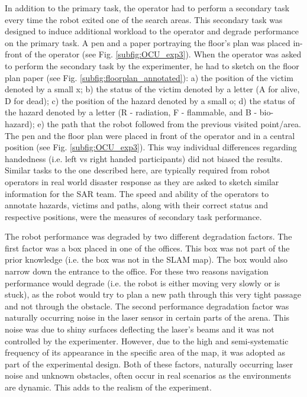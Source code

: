\documentclass[a4paper,12pt,oneside,openright]{bhamthesis}
\begin{document}
In addition to the primary task, the operator had to perform a secondary task every time the robot exited one of the search areas. This secondary task was designed to induce additional workload to the operator and degrade performance on the primary task. A pen and a paper portraying the floor's plan was placed in-front of the operator (see Fig. \ref{subfig:OCU_exp3}). When the operator was asked to perform the secondary task by the experimenter, he had to sketch on the floor plan paper (see Fig. \ref{subfig:floorplan_annotated}): a) the position of the victim denoted by a small x; b) the status of the victim denoted by a letter (A for alive, D for dead); c) the position of the hazard denoted by a small o; d) the status of the hazard denoted by a letter (R - radiation, F - flammable, and B - bio-hazard); e) the path that the robot followed from the previous visited point/area. The pen and the floor plan were placed in front of the operator and in a central position (see Fig. \ref{subfig:OCU_exp3}). This way individual differences regarding handedness (i.e. left vs right handed participants) did not biased the results. Similar tasks to the one described here, are typically required from robot operators in real world disaster response \cite{Murphy2004} as they are asked to sketch similar information for the SAR team. The speed and ability of the operators to annotate hazards, victims and paths, along with their correct status and respective positions, were the measures of secondary task performance.

The robot performance was degraded by two different degradation factors. The first factor was a box placed in one of the offices. This box was not part of the prior knowledge (i.e. the box was not in the SLAM map). The box would also narrow down the entrance to the office. For these two reasons navigation performance would degrade (i.e. the robot is either moving very slowly or is stuck), as the robot would try to plan a new path through this very tight passage and not through the obstacle. The second performance degradation factor was naturally occurring noise in the laser sensor in certain parts of the arena. This noise was due to shiny surfaces deflecting the laser's beams and it was not controlled by the experimenter. However, due to the high and semi-systematic frequency of its appearance in the specific area of the map, it was adopted as part of the experimental design. Both of these factors, naturally occurring laser noise and unknown obstacles, often occur in real scenarios as the environments are dynamic. This adds to the realism of the experiment.  
\end{document}
